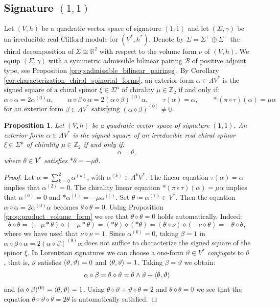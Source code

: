 \documentclass[10pt,reqno]{amsart}
\newtheorem{proposition}[theorem]{Proposition}
\theoremstyle{definition}
\theoremstyle{remark}
\newcommand{\Z}{\mathbb{Z}}
\newcommand{\R}{\mathbb{R}}
\DeclarePairedDelimiter{\escal}{\langle}{\rangle}
\begin{document}
\subsection{Signature \texorpdfstring{$(1,1)$}{(1,1)}}

Let $(V,h)$ be a quadratic vector space of signature $(1,1)$ and let $(\Sigma,\gamma)$ be an irreducible real Clifford module for $(V^*,h^*)$. Denote by $\Sigma=\Sigma^+\oplus\Sigma^-$ the chiral decomposition of $\Sigma\cong\R^2$ with respect to the volume form $\nu$ of $(V,h)$. We equip $(\Sigma,\gamma)$ with a symmetric admissible bilinear pairing $\mathscr{B}$ of positive adjoint type, see Proposition \ref{prop:admissible_bilinear_pairings}. By Corollary \ref{cor:characterization_chiral_spinorial_forms}, an exterior form $\alpha\in\Lambda V^*$ is the signed square of a chiral spinor $\xi\in\Sigma^\mu$ of chirality $\mu\in\Z_2$ if and only if: $$\alpha\diamond\alpha=2\alpha^{(0)}\alpha,\qquad \alpha\diamond\beta\diamond\alpha=2(\alpha\diamond\beta)^{(0)}\alpha,\qquad\tau(\alpha)=\alpha,\qquad*(\pi\circ\tau)(\alpha)=\mu\alpha$$ for an exterior form $\beta\in\Lambda V^*$ satisfying $(\alpha\diamond\beta)^{(0)}\neq0$.

\begin{proposition}\label{prop:square_(1,1)}
    Let $(V,h)$ be a quadratic vector space of signature $(1,1)$. An exterior form $\alpha\in\Lambda V^*$ is the signed square of an irreducible real chiral spinor $\xi\in\Sigma^\mu$ of chirality $\mu\in\Z_2$ if and only if: $$\alpha=\theta,$$ where $\theta\in V^*$ satisfies $*\theta=-\mu\theta$.
\end{proposition}

\begin{proof}
    Let $\alpha=\sum_{k=0}^2\alpha^{(k)}$, with $\alpha^{(k)}\in\Lambda^kV^*$. The linear equation $\tau(\alpha)=\alpha$ implies that $\alpha^{(2)}=0$. The chirality linear equation $*(\pi\circ\tau)(\alpha)=\mu\alpha$ implies that $\alpha^{(0)}=0$ and $*\alpha^{(1)}=-\mu\alpha^{(1)}$. Set $\theta\coloneqq\alpha^{(1)}\in V^*$. Then the equation $\alpha\diamond\alpha=2\alpha^{(0)}\alpha$ becomes $\theta\diamond\theta=0$. Using Proposition \ref{prop:product_volume_form} we see that $\theta\diamond\theta=0$ holds automatically. Indeed: $$\theta\diamond\theta=(-\mu*\theta)\diamond(-\mu*\theta)=(*\theta)\diamond(*\theta)=(\theta\diamond\nu)\diamond(-\nu\diamond\theta)=-\theta\diamond\theta,$$ where we have used that $\nu\diamond\nu=1$. Since $\alpha^{(0)}=0$, taking $\beta=1$ in $\alpha\diamond\beta\diamond\alpha=2(\alpha\diamond\beta)^{(0)}\alpha$ does not suffice to characterize the signed square of the spinor $\xi$. In Lorentzian signatures we can choose a one-form $\vartheta\in V^*$ \emph{conjugate} to $\theta$, that is, $\vartheta$ satisfies $\escal{\vartheta,\vartheta}=0$ and $\escal{\theta,\vartheta}=1$. Taking $\beta=\vartheta$ we obtain: $$\alpha\diamond\beta=\theta\diamond\vartheta=\theta\wedge\vartheta+\escal{\theta,\vartheta}$$ and $(\alpha\diamond\beta)^{(0)}=\escal{\theta,\vartheta}=1$. Using $\theta\diamond\vartheta+\vartheta\diamond\theta=2$ and $\theta\diamond\theta=0$ we see that the equation $\theta\diamond\vartheta\diamond\theta=2\theta$ is automatically satisfied.
\end{proof}
\end{document}
